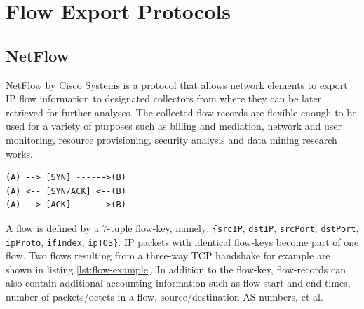 \chapter{Flow Export Protocols}\label{ch:flow-export-protocols}

\section{NetFlow}\label{sec:netflow}
NetFlow \cite{rfc3954} by Cisco Systems is a protocol that allows network elements to export \ac{IP} flow information to designated collectors from where they can be later retrieved for further analyses. The collected flow-records are flexible enough to be used for a variety of purposes such as billing and mediation, network and user monitoring, resource provisioning, security analysis and data mining research works.  

\begin{lstlisting}
(A) --> [SYN] ------>(B)
(A) <-- [SYN/ACK] <--(B)
(A) --> [ACK] ------>(B)
\end{lstlisting}
A flow is defined by a $7$-tuple flow-key, namely: \texttt{\{srcIP}, \texttt{dstIP}, \texttt{srcPort}, \texttt{dstPort}, \texttt{ipProto}, \texttt{ifIndex}, \texttt{ipTOS\}}. \ac{IP} packets with identical flow-keys become part of one flow. Two flows resulting from a three-way \ac{TCP} handshake for  example are shown in listing \ref{lst:flow-example}. In addition to the flow-key, flow-records can also contain additional accounting information such as flow start and end times, number of packets/octets in a flow, source/destination \ac{AS} numbers, et al.


